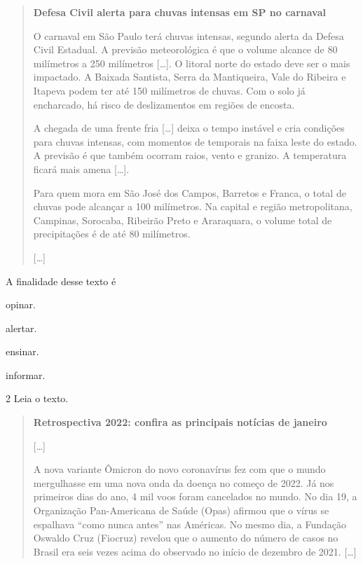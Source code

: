 \begin{quote}
\textbf{Defesa Civil alerta para chuvas intensas em SP no carnaval}

O carnaval em São Paulo terá chuvas intensas, segundo alerta da Defesa
Civil Estadual. A previsão meteorológica é que o volume alcance de 80
milímetros a 250 milímetros {[}\ldots{]}. O litoral norte do estado deve
ser o mais impactado. A Baixada Santista, Serra da Mantiqueira, Vale do
Ribeira e Itapeva podem ter até 150 milímetros de chuvas. Com o solo já
encharcado, há risco de deslizamentos em regiões de encosta.

A chegada de uma frente fria {[}\ldots{]} deixa o tempo instável e cria
condições para chuvas intensas, com momentos de temporais na faixa leste
do estado. A previsão é que também ocorram raios, vento e granizo. A
temperatura ficará mais amena {[}\ldots{]}.

Para quem mora em São José dos Campos, Barretos e Franca, o total de
chuvas pode alcançar a 100 milímetros. Na capital e região
metropolitana, Campinas, Sorocaba, Ribeirão Preto e Araraquara, o volume
total de precipitações é de até 80 milímetros.

{[}\ldots{]}

\end{quote}

A finalidade desse texto é

\begin{escolha}
\item opinar.

\item alertar.

\item ensinar.

\item informar.
\end{escolha}

\num{2} Leia o texto.

\begin{quote}
\textbf{Retrospectiva 2022: confira as principais notícias de janeiro}

{[}\ldots{]}

A nova variante Ômicron do novo coronavírus fez com que o mundo
mergulhasse em uma nova onda da doença no começo de 2022. Já nos
primeiros dias do ano, 4 mil voos foram cancelados no mundo. No dia 19,
a Organização Pan-Americana de Saúde (Opas) afirmou que o vírus se
espalhava ``como nunca antes'' nas Américas. No mesmo dia, a Fundação
Oswaldo Cruz (Fiocruz) revelou que o aumento do número de casos no
Brasil era seis vezes acima do observado no início de dezembro de 2021.
{[}\ldots{]}

\end{quote}


